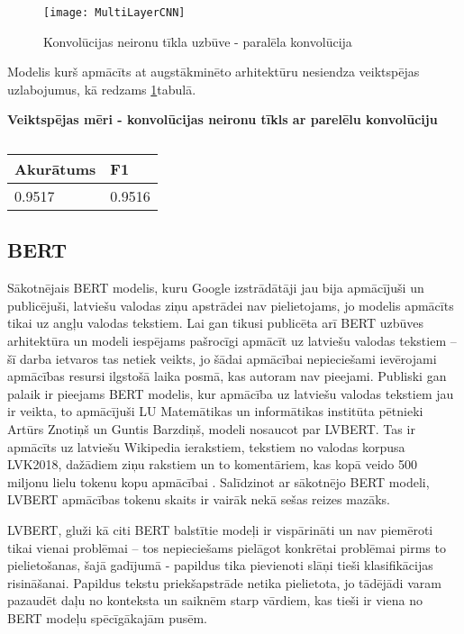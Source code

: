 \begin{figure}[H]
	\centering
	\texttt{[image: MultiLayerCNN]}
	\caption{Konvolūcijas neironu tīkla uzbūve - paralēla konvolūcija}
	\label{fig:MultiLayerCNN}
\end{figure}

\pagebreak
Modelis kurš apmācīts at augstākminēto arhitektūru nesiendza veiktspējas uzlabojumus, kā redzams \ref{tab:score_cnn_multi}tabulā.

\begin{table}[H]
\centering
\caption{\label{tab:score_cnn_multi}}
\textbf{Veiktspējas mēri -  konvolūcijas neironu tīkls ar parelēlu konvolūciju\\}
\begin{tabular}{|l|l|}
\hline
Akurātums & F1 \\ \hline
0.9517 & 0.9516  \\ \hline
\end{tabular}
\end{table}

\subsection{BERT}
Sākotnējais BERT modelis, kuru Google izstrādātāji jau bija apmācījuši un publicējuši, latviešu valodas ziņu apstrādei nav pielietojams, jo modelis apmācīts tikai uz angļu valodas tekstiem. Lai gan tikusi publicēta arī BERT uzbūves arhitektūra un modeli iespējams pašrocīgi apmācīt uz latviešu valodas tekstiem – šī darba ietvaros tas netiek veikts, jo šādai apmācībai nepieciešami ievērojami apmācības resursi ilgstošā laika posmā, kas autoram nav pieejami. Publiski gan palaik ir pieejams BERT modelis, kur apmācība uz latviešu valodas tekstiem jau ir veikta, to apmācījuši LU Matemātikas un informātikas institūta pētnieki Artūrs Znotiņš un Guntis Barzdiņš, modeli nosaucot par LVBERT. Tas ir apmācīts uz latviešu Wikipedia ierakstiem, tekstiem no valodas korpusa LVK2018, dažādiem ziņu rakstiem un to komentāriem, kas kopā veido 500 miljonu lielu tokenu kopu apmācībai \cite{lvbert}. Salīdzinot ar sākotnējo BERT modeli, LVBERT apmācības tokenu skaits ir vairāk nekā sešas reizes mazāks.

LVBERT, gluži kā citi BERT balstītie modeļi ir vispārināti un nav piemēroti tikai vienai problēmai – tos nepieciešams pielāgot konkrētai problēmai pirms to pielietošanas, šajā gadījumā - papildus tika pievienoti slāņi tieši klasifikācijas risināšanai. Papildus tekstu priekšapstrāde netika pielietota, jo tādējādi varam pazaudēt daļu no konteksta un saiknēm starp vārdiem, kas tieši ir viena no BERT modeļu spēcīgākajām pusēm.

